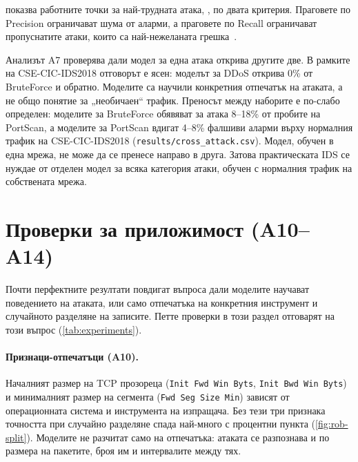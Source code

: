  показва работните точки за най-трудната атака, , по двата критерия. Праговете по Precision ограничават шума от аларми, а праговете по Recall ограничават пропуснатите атаки, които са най-нежеланата грешка~\cite{borovska2022,axelsson2000}.

\begin{table}[H]
\centering\small
\caption{Работни точки за PortScan при естествено съотношение: праг по целева Precision или по целеви Recall}\label{tab:ops}

\vspace{2pt}
\end{table}

Анализът A7 проверява дали модел за една атака открива другите две. В рамките на CSE-CIC-IDS2018 отговорът е ясен: моделът за DDoS открива 0\% от BruteForce и обратно. Моделите са научили конкретния отпечатък на атаката, а не общо понятие за „необичаен“ трафик. Преносът между наборите е по-слабо определен: моделите за BruteForce обявяват за атака 8--18\% от пробите на PortScan, а моделите за PortScan вдигат 4--8\% фалшиви аларми върху нормалния трафик на CSE-CIC-IDS2018 (\texttt{results/cross\_attack.csv}). Модел, обучен в една мрежа, не може да се пренесе направо в друга. Затова практическата IDS се нуждае от отделен модел за всяка категория атаки, обучен с нормалния трафик на собствената мрежа.

\section{Проверки за приложимост (A10--A14)}\label{sec:r-rob}

Почти перфектните резултати повдигат въпроса дали моделите научават поведението на атаката, или само отпечатъка на конкретния инструмент и случайното разделяне на записите. Петте проверки в този раздел отговарят на този въпрос (\cref{tab:experiments}).

\paragraph{Признаци-отпечатъци (A10).} Началният размер на TCP прозореца (\texttt{Init Fwd Win Byts}, \texttt{Init Bwd Win Byts}) и минималният размер на сегмента (\texttt{Fwd Seg Size Min}) зависят от операционната система и инструмента на изпращача. Без тези три признака точността при случайно разделяне спада най-много с  процентни пункта (\cref{fig:rob-split}). Моделите не разчитат само на отпечатъка: атаката се разпознава и по размера на пакетите, броя им и интервалите между тях.

